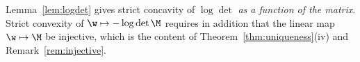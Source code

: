 \begin{remark}
Lemma~\ref{lem:logdet} gives strict concavity of $\log\det$ \emph{as a function
of the matrix}. Strict convexity of $\w\mapsto-\log\det\M$ requires in addition
that the linear map $\w\mapsto\M$ be injective, which is the content of
Theorem~\ref{thm:uniqueness}(iv) and Remark~\ref{rem:injective}.
\end{remark}

